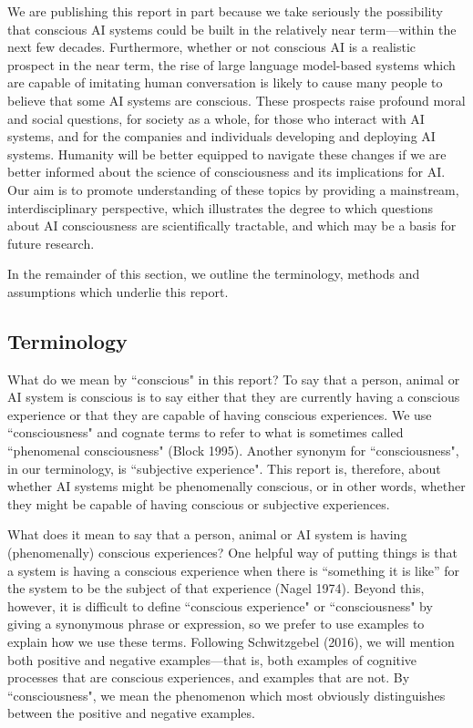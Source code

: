 \documentclass[12pt]{article}
\begin{document}
We are publishing this report in part because we take seriously the possibility that conscious AI systems could be built in the relatively near term—within the next few decades. Furthermore, whether or not conscious AI is a realistic prospect in the near term, the rise of large language model-based systems which are capable of imitating human conversation is likely to cause many people to believe that some AI systems are conscious. These prospects raise profound moral and social questions, for society as a whole, for those who interact with AI systems, and for the companies and individuals developing and deploying AI systems. Humanity will be better equipped to navigate these changes if we are better informed about the science of consciousness and its implications for AI. Our aim is to promote understanding of these topics by providing a mainstream, interdisciplinary perspective, which illustrates the degree to which questions about AI consciousness are scientifically tractable, and which may be a basis for future research.

In the remainder of this section, we outline the terminology, methods and assumptions which underlie this report.

\subsection{Terminology}

What do we mean by ``conscious" in this report? To say that a person, animal or AI system is conscious is to say either that they are currently having a conscious experience or that they are capable of having conscious experiences. We use ``consciousness" and cognate terms to refer to what is sometimes called ``phenomenal consciousness" (Block 1995). Another synonym for ``consciousness", in our terminology, is ``subjective experience". This report is, therefore, about whether AI systems might be phenomenally conscious, or in other words, whether they might be capable of having conscious or subjective experiences.

What does it mean to say that a person, animal or AI system is having (phenomenally) conscious experiences? One helpful way of putting things is that a system is having a conscious experience when there is ``something it is like'' for the system to be the subject of that experience (Nagel 1974). Beyond this, however, it is difficult to define ``conscious experience" or ``consciousness" by giving a synonymous phrase or expression, so we prefer to use examples to explain how we use these terms. Following Schwitzgebel (2016), we will mention both positive and negative examples—that is, both examples of cognitive processes that are conscious experiences, and examples that are not. By ``consciousness", we mean the phenomenon which most obviously distinguishes between the positive and negative examples.
\end{document}
